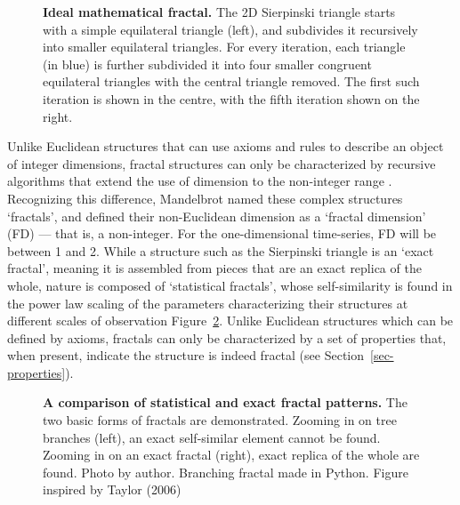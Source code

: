 \documentclass[
  sn-vancouver,
  Numbered,
  referee,
  lineno]{sn-jnl}
\begin{document}
\begin{figure}[H]


\caption{\label{fig-fractal}\textbf{Ideal mathematical fractal.} The 2D
Sierpinski triangle starts with a simple equilateral triangle (left),
and subdivides it recursively into smaller equilateral triangles. For
every iteration, each triangle (in blue) is further subdivided it into
four smaller congruent equilateral triangles with the central triangle
removed. The first such iteration is shown in the centre, with the fifth
iteration shown on the right.}

\end{figure}%

Unlike Euclidean structures that can use axioms and rules to describe an
object of integer dimensions, fractal structures can only be
characterized by recursive algorithms that extend the use of dimension
to the non-integer range \citep{hermanFractalBranchingPattern2001}.
Recognizing this difference, Mandelbrot named these complex structures
`fractals', and defined their non-Euclidean dimension as a `fractal
dimension' (FD) --- that is, a non-integer. For the one-dimensional
time-series, FD will be between 1 and 2. While a structure such as the
Sierpinski triangle is an `exact fractal', meaning it is assembled from
pieces that are an exact replica of the whole, nature is composed of
`statistical fractals', whose self-similarity is found in the power law
scaling of the parameters characterizing their structures at different
scales of observation Figure~\ref{fig-statisticalfractal}. Unlike
Euclidean structures which can be defined by axioms, fractals can only
be characterized by a set of properties that, when present, indicate the
structure is indeed fractal (see Section~\ref{sec-properties}).

\begin{figure}


\caption{\label{fig-statisticalfractal}\textbf{A comparison of
statistical and exact fractal patterns.} The two basic forms of fractals
are demonstrated. Zooming in on tree branches (left), an exact
self-similar element cannot be found. Zooming in on an exact fractal
(right), exact replica of the whole are found. Photo by author.
Branching fractal made in Python. Figure inspired by Taylor (2006)
\citep{taylorPersonalReflectionsJackson2006}}

\end{figure}%
\end{document}
